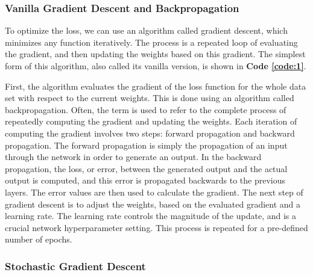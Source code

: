 \subsubsection{Vanilla Gradient Descent and Backpropagation}

\noindent To optimize the loss, we can use an algorithm called gradient descent, which minimizes any function iteratively. The process is a repeated loop of evaluating the gradient, and then updating the weights based on this gradient. The simplest form of this algorithm, also called its vanilla version, is shown in \textbf{Code \ref{code:1}}.


\noindent First, the algorithm evaluates the gradient of the loss function for the whole data set with respect to the current weights. This is done using an algorithm called backpropagation. Often, the term is used to refer to the complete process of repeatedly computing the gradient and updating the weights. Each iteration of computing the gradient involves two steps: forward propagation and backward propagation. The forward propagation is simply the propagation of an input through the network in order to generate an output. In the backward propagation, the loss, or error, between the generated output and the actual output is computed, and this error is propagated backwards to the previous layers. The error values are then used to calculate the gradient. The next step of gradient descent is to adjust the weights, based on the evaluated gradient and a learning rate. The learning rate controls the magnitude of the update, and is a crucial network hyperparameter setting. This process is repeated for a pre-defined number of epochs.

\subsubsection{Stochastic Gradient Descent}

